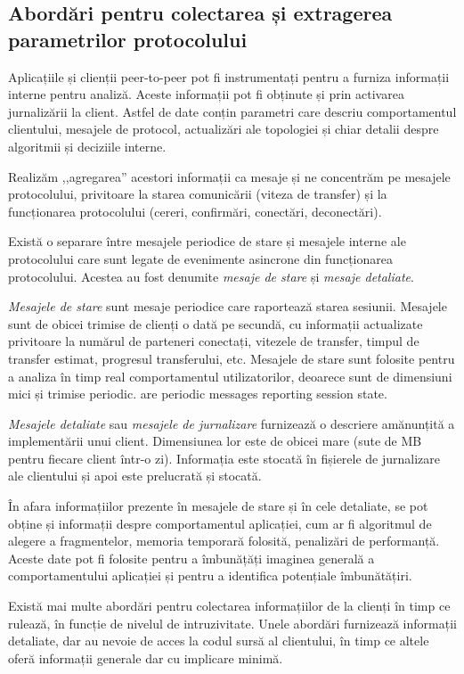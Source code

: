 \subsection{Abordări pentru colectarea și extragerea parametrilor protocolului}

Aplicațiile și clienții peer-to-peer pot fi instrumentați pentru a furniza
informații interne pentru analiză. Aceste informații pot fi obținute și prin
activarea jurnalizării la client. Astfel de date conțin parametri care descriu
comportamentul clientului, mesajele de protocol, actualizări ale topologiei
și chiar detalii despre algoritmii și deciziile interne.

Realizăm ,,agregarea'' acestori informații ca mesaje și ne concentrăm pe
mesajele protocolului, privitoare la starea comunicării (viteza de transfer)
și la funcționarea protocolului (cereri, confirmări, conectări, deconectări).

Există o separare între mesajele periodice de stare și mesajele interne ale
protocolului care sunt legate de evenimente asincrone din funcționarea
protocolului. Acestea au fost denumite \textit{mesaje de stare} și
\textit{mesaje detaliate}.

\textit{Mesajele de stare} sunt mesaje periodice care raportează starea
sesiunii. Mesajele sunt de obicei trimise de clienți o dată pe secundă, cu
informații actualizate privitoare la numărul de parteneri conectați,
vitezele de transfer, timpul de transfer estimat, progresul transferului, etc.
Mesajele de stare sunt folosite pentru a analiza în timp real comportamentul
utilizatorilor, deoarece sunt de dimensiuni mici și trimise periodic.
are periodic messages reporting session state.

\textit{Mesajele detaliate} sau \textit{mesajele de jurnalizare} 
furnizează o descriere amănunțită a implementării unui client. Dimensiunea lor
este de obicei mare (sute de MB pentru fiecare client într-o zi). Informația
este stocată în fișierele de jurnalizare ale clientului și apoi este prelucrată
și stocată.

În afara informațiilor prezente în mesajele de stare și în cele detaliate,
se pot obține și informații despre comportamentul aplicației, cum ar fi
algoritmul de alegere a fragmentelor, memoria temporară folosită, penalizări
de performanță. Aceste date pot fi folosite pentru a îmbunățăți imaginea
generală a comportamentului aplicației și pentru a identifica potențiale
îmbunătățiri.

Există mai multe abordări pentru colectarea informațiilor de la clienți în
timp ce rulează, în funcție de nivelul de intruzivitate. Unele abordări
furnizează informații detaliate, dar au nevoie de acces la codul sursă al
clientului, în timp ce altele oferă informații generale dar cu implicare minimă.

